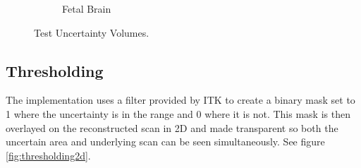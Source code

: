 \begin{figure}[h]
\begin{subfigure}[b]{0.18\textwidth}
    \caption{Fetal Brain}
    \label{fig:test_example}
  \end{subfigure}
  \caption{Test Uncertainty Volumes.}\label{fig:test_uncertainties}
\end{figure}

\clearpage
\subsection{Thresholding}
The implementation uses a filter provided by ITK to create a binary mask set to 1 where the uncertainty is in the range and 0 where it is not. This mask is then overlayed on the reconstructed scan in 2D and made transparent so both the uncertain area and underlying scan can be seen simultaneously. See figure \ref{fig:thresholding2d}.

